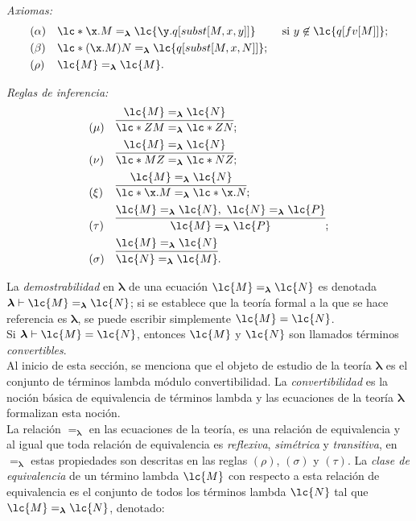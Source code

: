 \emph{Axiomas:}
\begin{align*}
  &(\alpha) & & \lc*{\x.M}=_{\boldsymbol{\lambda}}\lc{\y.q[subst[M,x,y]]} & &\text{ si } y \not\in \lc{q[fv[M]]}; \\
  &(\beta)  & & \lc*{(\x.M)N}=_{\boldsymbol{\lambda}}\lc{q[subst[M,x,N]]}; \\
  &(\rho)   & & \lc{M}=_{\boldsymbol{\lambda}}\lc{M}.
\end{align*}

\emph{Reglas de inferencia:}
\begin{align*}
  &(\mu)    & & \infer{\lc*{Z M}=_{\boldsymbol{\lambda}}\lc*{Z N}}{\lc{M}=_{\boldsymbol{\lambda}}\lc{N}}; \\
  &(\nu)    & & \infer{\lc*{M Z}=_{\boldsymbol{\lambda}}\lc*{N Z}}{\lc{M}=_{\boldsymbol{\lambda}}\lc{N}}; \\
  &(\xi)    & & \infer{\lc*{\x.M}=_{\boldsymbol{\lambda}}\lc*{\x.N}}{\lc{M}=_{\boldsymbol{\lambda}}\lc{N}}; \\
  &(\tau)   & & \infer{\lc{M}=_{\boldsymbol{\lambda}}\lc{P}}{\lc{M}=_{\boldsymbol{\lambda}}\lc{N},\ \lc{N}=_{\boldsymbol{\lambda}}\lc{P}}; \\
  &(\sigma) & & \infer{\lc{N}=_{\boldsymbol{\lambda}}\lc{M}}{\lc{M}=_{\boldsymbol{\lambda}}\lc{N}}.
\end{align*}

La \emph{demostrabilidad} en \(\boldsymbol{\lambda}\) de una ecuación
\(\lc{M}=_{\boldsymbol{\lambda}}\lc{N}\) es denotada \(\boldsymbol{\lambda}
\vdash \lc{M}=_{\boldsymbol{\lambda}}\lc{N}\); si se establece que la teoría
formal a la que se hace referencia es \(\boldsymbol{\lambda}\), se puede
escribir simplemente \(\lc{M}=\lc{N}\). \\

Si \(\boldsymbol{\lambda} \vdash \lc{M}=\lc{N}\), entonces \(\lc{M}\) y \(\lc{N}\)
son llamados términos \emph{convertibles}. \\

Al inicio de esta sección, se menciona que el objeto de estudio de la teoría
\(\boldsymbol{\lambda}\) es el conjunto de términos lambda módulo
convertibilidad. La \emph{convertibilidad} es la noción básica de equivalencia
de términos lambda y las ecuaciones de la teoría \(\boldsymbol{\lambda}\)
formalizan esta noción. \\

La relación \(=_{\boldsymbol{\lambda}}\) en las ecuaciones de la teoría, es una
relación de equivalencia y al igual que toda relación de equivalencia es
\emph{reflexiva}, \emph{simétrica} y \emph{transitiva}, en
\(=_{\boldsymbol{\lambda}}\) estas propiedades son descritas en las reglas
\((\rho)\), \((\sigma)\) y \((\tau)\). La \emph{clase de equivalencia} de un
término lambda \(\lc{M}\) con respecto a esta relación de equivalencia es el
conjunto de todos los términos lambda \(\lc{N}\) tal que
\(\lc{M}=_{\boldsymbol{\lambda}}\lc{N}\), denotado:

